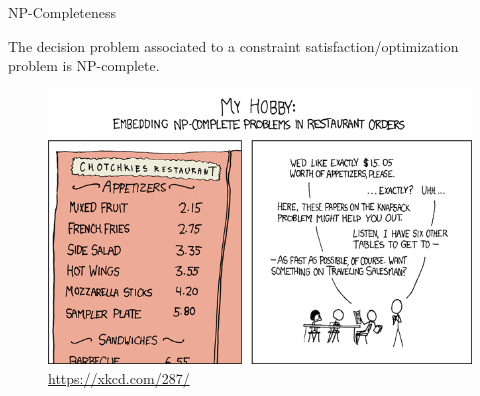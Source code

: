 \begin{frame}{NP-Completeness}
\begin{theorem}
The decision problem associated to a constraint satisfaction/optimization problem is NP-complete.
\end{theorem}

\begin{center}
\begin{figure}
\includegraphics[width=.7\textwidth]{img/np_complete.png}
\caption{\url{https://xkcd.com/287/} }
\end{figure}
\end{center}
\end{frame}

